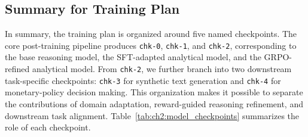 \subsection*{Summary for Training Plan}
In summary, the training plan is organized around five named checkpoints. The core post-training pipeline produces \texttt{chk-0}, \texttt{chk-1}, and \texttt{chk-2}, corresponding to the base reasoning model, the SFT-adapted analytical model, and the GRPO-refined analytical model. From \texttt{chk-2}, we further branch into two downstream task-specific checkpoints: \texttt{chk-3} for synthetic text generation and \texttt{chk-4} for monetary-policy decision making. This organization makes it possible to separate the contributions of domain adaptation, reward-guided reasoning refinement, and downstream task alignment. Table~\ref{tab:ch2:model_checkpoints} summarizes the role of each checkpoint.

